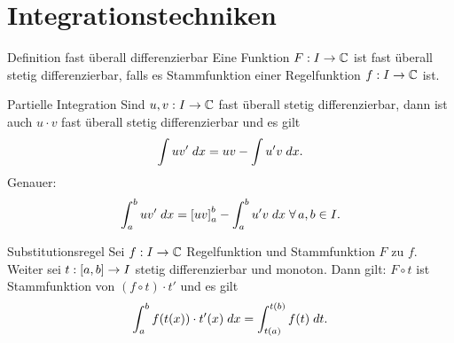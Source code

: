 \documentclass[main.tex]{subfiles}
\begin{document}
\section*{Integrationstechniken}

\begin{karte}{Definition fast überall differenzierbar}
    Eine Funktion \( \abb{F}{I}{\C} \) ist fast überall 
    stetig differenzierbar, falls es Stammfunktion einer 
    Regelfunktion \( \abb{f}{I}{\C} \) ist.
\end{karte}

\begin{karte}{Partielle Integration}
    Sind \(\abb{u,v}{I}{\C}\) fast überall stetig 
    differenzierbar, dann ist auch 
    \( u \cdot v \) fast überall stetig differenzierbar und 
    es gilt 
    \[ \int u v' \dx = uv - \int u' v \dx. \]
    Genauer: 
    \[ \integral{uv'}{a}{b} 
    = \left[ uv \right]_a^b - \integral{u'v}{a}{b} 
    \;\forall a,b\in I. \]
\end{karte}

\begin{karte}{Substitutionsregel}
    Sei \( \abb{f}{I}{\C} \) Regelfunktion 
    und Stammfunktion \(F\) zu \(f\).
    Weiter sei \( \abb{t}{[a,b]}{I} \) 
    stetig differenzierbar und monoton.
    Dann gilt:    
    \( F \circ t \) ist Stammfunktion von 
    \( (f\circ t) \cdot t' \)
    und es gilt 
    \[ \integral{f(t(x)) \cdot t'(x)}{a}{b} 
    = \integralx{f(t)}{t(a)}{t(b)}{t}. \]
\end{karte}
\end{document}
